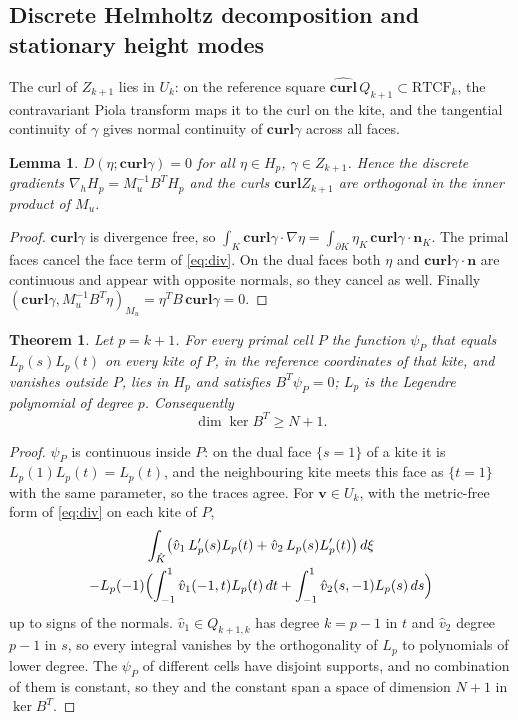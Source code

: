 \documentclass[preprint,12pt]{elsarticle}
\newcommand{\bv}{\mathbf{v}}
\newcommand{\bn}{\mathbf{n}}
\newcommand{\curl}{\mathbf{curl}}
\newtheorem{theorem}{Theorem}
\newtheorem{lemma}{Lemma}
\theoremstyle{definition}
\begin{document}
\subsection{Discrete Helmholtz decomposition and stationary height modes}
The curl of $Z_{k+1}$ lies in $U_k$: on the reference square $\widehat{\curl}\,Q_{k+1}\subset\mathrm{RTCF}_k$,
the contravariant Piola transform maps it to the curl on the kite, and the tangential continuity of
$\gamma$ gives normal continuity of $\curl\gamma$ across all faces.

\begin{lemma}\label{lem:bcurl}
$D(\eta;\curl\gamma) = 0$ for all $\eta\in H_p$, $\gamma\in Z_{k+1}$. Hence the discrete gradients
$\nabla_h H_p = M_u^{-1}B^TH_p$ and the curls $\curl Z_{k+1}$ are orthogonal in the inner product of $M_u$.
\end{lemma}
\begin{proof}
$\curl\gamma$ is divergence free, so $\int_K\curl\gamma\cdot\nabla\eta = \int_{\partial K}\eta_K\,\curl\gamma\cdot\bn_K$.
The primal faces cancel the face term of \eqref{eq:div}. On the dual faces both $\eta$ and
$\curl\gamma\cdot\bn$ are continuous and appear with opposite normals, so they cancel as well. Finally
$(\curl\gamma, M_u^{-1}B^T\eta)_{M_u} = \eta^TB\,\curl\gamma = 0$.
\end{proof}

\begin{theorem}\label{thm:kernel}
Let $p = k + 1$. For every primal cell $P$ the function $\psi_P$ that equals $L_p(s)L_p(t)$ on every kite of
$P$, in the reference coordinates of that kite, and vanishes outside $P$, lies in $H_p$ and satisfies
$B^T\psi_P = 0$; $L_p$ is the Legendre polynomial of degree $p$. Consequently
\[
  \dim\ker B^T \ge N + 1 .
\]
\end{theorem}
\begin{proof}
$\psi_P$ is continuous inside $P$: on the dual face $\{s = 1\}$ of a kite it is $L_p(1)L_p(t) = L_p(t)$,
and the neighbouring kite meets this face as $\{t = 1\}$ with the same parameter, so the traces agree.
For $\bv\in U_k$, with the metric-free form of \eqref{eq:div} on each kite of $P$,
\begin{multline*}
  \int_{\hat K}\bigl(\hat v_1\,L_p'(s)L_p(t) + \hat v_2\,L_p(s)L_p'(t)\bigr)\,d\xi\\
  - L_p(-1)\Bigl(\int_{-1}^1 \hat v_1(-1,t)L_p(t)\,dt + \int_{-1}^1 \hat v_2(s,-1)L_p(s)\,ds\Bigr)
\end{multline*}
up to signs of the normals. $\hat v_1\in Q_{k+1,k}$ has degree $k = p - 1$ in $t$ and $\hat v_2$ degree
$p-1$ in $s$, so every integral vanishes by the orthogonality of $L_p$ to polynomials of lower degree.
The $\psi_P$ of different cells have disjoint supports, and no combination of them is constant, so they
and the constant span a space of dimension $N + 1$ in $\ker B^T$.
\end{proof}
\end{document}
